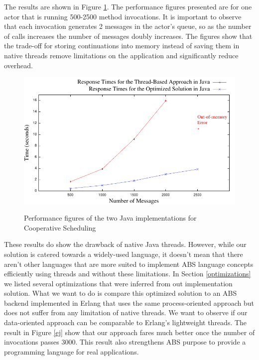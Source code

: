 \par The results are shown in Figure \ref{jj}.  The performance figures presented are for one actor that is running 500-2500 method invocations. It is important to observe that each invocation generates 2 messages in the actor's queue, so as the number of calls increases the number of messages doubly increases. The figures show that the trade-off for storing continuations into memory instead of saving them in native threads remove limitations on the application and significantly reduce overhead.


\begin{figure}
	\caption{Performance figures of the two Java implementations for Cooperative Scheduling}
	\centering
	\includegraphics[scale=0.8]{jaj8.pdf}
	\label{jj}
\end{figure}

\par These results do show the drawback of native Java threads. However, while our solution is catered towards a widely-used language, it doesn't mean that there aren't other languages that are more suited to implement ABS language concepts efficiently using threads and without these limitations. In Section \ref{optimizations} we listed several optimizations that were inferred from out implementation solution. What we want to do is compare this optimized solution to an ABS backend implemented in Erlang that uses the same process-oriented approach but does not suffer from any limitation of native threads. We want to observe if our data-oriented approach can be comparable to Erlang's lightweight threads. The result in Figure \ref{ej} show that our approach fares much better once the number of invocations passes 3000. This result also strengthens ABS purpose to provide a programming language for real applications.

